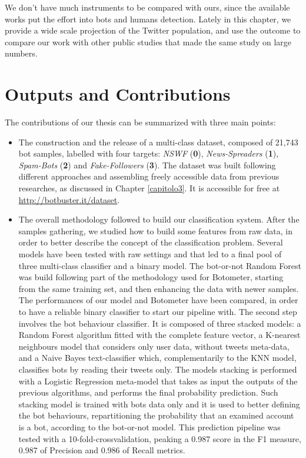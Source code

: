 \begin{itemize}
We don't have much instruments to be compared with ours, since the available works put the effort into bots and humans detection. Lately in this chapter, we provide a wide scale projection of the Twitter population, and use the outcome to compare our work with other public studies that made the same study on large numbers.
\end{itemize}


\section{Outputs and Contributions}
The contributions of our thesis can be summarized with three main points:

\begin{itemize}
	\item[\PencilRight] The construction and the release of a multi-class dataset, composed of 21,743 bot samples, labelled with four targets: \textit{NSWF} (\textbf{0}), \textit{News-Spreaders} (\textbf{1}), \textit{Spam-Bots} (\textbf{2}) and \textit{Fake-Followers} (\textbf{3}).
	The dataset was built following different approaches and assembling freely accessible data from previous researches, as discussed in Chapter \ref{capitolo3}.
	It is accessible for free at \url{http://botbuster.it/dataset}.
	
	\item[\PencilRight] The overall methodology followed to build our classification system. After the samples gathering, we studied how to build some features from raw data, in order to better describe the concept of the classification problem. Several models have been tested with raw settings and that led to a final pool of three multi-class classifier and a binary model.
	The bot-or-not Random Forest was build following part of the methodology used for Botometer, starting from the same training set, and then enhancing the data with newer samples. The performances of our model and Botometer have been compared, in order to have a reliable binary classifier to start our pipeline with.
	The second step involves the bot behaviour classifier. It is composed of three stacked models: a Random Forest algorithm fitted with the complete feature vector, a K-nearest neighbours model that considers only user data, without tweets meta-data, and a Naive Bayes text-classifier which, complementarily to the KNN model, classifies bots by reading their tweets only. The models stacking is performed with a Logistic Regression meta-model that takes as input the outputs of the previous algorithms, and performs the final probability prediction. Such stacking model is trained with bots data only and it is used to better defining the bot behaviours, repartitioning the probability that an examined account is a bot, according to the bot-or-not model. This prediction pipeline was tested with a 10-fold-crossvalidation, peaking a 0.987 score in the F1 measure, 0.987 of Precision and 0.986 of Recall metrics.
	

\end{itemize}

